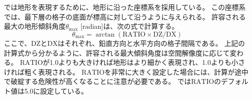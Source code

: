 \section{\SecBasicTopoSetting} \label{subsec:basic_usel_topo}

\scalerm では地形を表現するために、地形に沿った座標系を採用している。
この座標系では、最下層の格子の底面が標高に対して沿うように与えられる。
許容される最大の地形傾斜角度$\theta_{\max}$ [radian]は、次の式で計算する。
\[
  \theta_{\max} = \arctan( \mathrm{RATIO} \times \mathrm{DZ}/\mathrm{DX} )
\]
ここで、$\mathrm{DZ}$と$\mathrm{DX}$はそれぞれ、鉛直方向と水平方向の格子間隔である。
上記の計算式から分かるように、許容される最大傾斜角度は空間解像度に応じて変わる。
$\mathrm{RATIO}$が1.0よりも大きければ地形はより細かく表現され、1.0よりも小さければ粗く表現される。
$\mathrm{RATIO}$を非常に大きく設定した場合には、計算が途中で破綻する危険性が高くなることに注意が必要である。
\scalerm では$\mathrm{RATIO}$のデフォルト値は5.0に設定している。

